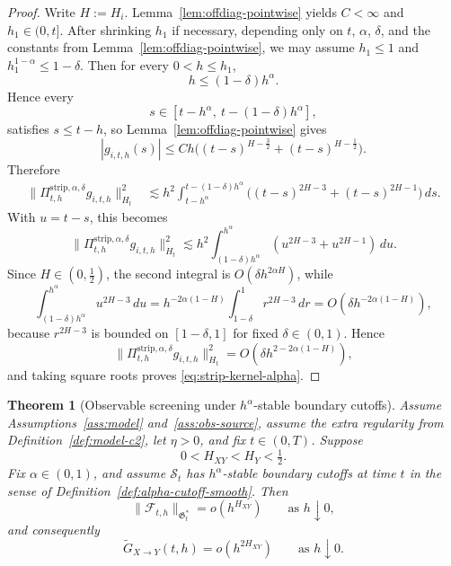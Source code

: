 \documentclass[11pt,a4paper]{amsart}
\theoremstyle{plain}
\newtheorem{theorem}{Theorem}[section]
\theoremstyle{definition}
\theoremstyle{remark}
\begin{document}
\begin{proof}
Write \(H:=H_i\). Lemma~\ref{lem:offdiag-pointwise} yields
\(C<\infty\) and \(h_1\in(0,t]\). After shrinking \(h_1\) if necessary, depending only on
\(t\), \(\alpha\), \(\delta\), and the constants from Lemma~\ref{lem:offdiag-pointwise}, we may
assume \(h_1\le1\) and \(h_1^{1-\alpha}\le1-\delta\). Then for every \(0<h\le h_1\),
\[
h\le (1-\delta)h^\alpha.
\]
Hence every
\[
s\in[t-h^\alpha,\ t-(1-\delta)h^\alpha],
\]
satisfies \(s\le t-h\), so Lemma~\ref{lem:offdiag-pointwise} gives
\[
|g_{i,t,h}(s)|
\le
Ch\bigl((t-s)^{H-\frac32}+(t-s)^{H-\frac12}\bigr).
\]
Therefore
\begin{align*}
\|\Pi_{t,h}^{\mathrm{strip},\alpha,\delta}g_{i,t,h}\|_{H_t}^2
&\lesssim
h^2\int_{t-h^\alpha}^{t-(1-\delta)h^\alpha}
\bigl((t-s)^{2H-3}+(t-s)^{2H-1}\bigr)\,ds.
\end{align*}
With \(u=t-s\), this becomes
\[
\|\Pi_{t,h}^{\mathrm{strip},\alpha,\delta}g_{i,t,h}\|_{H_t}^2
\lesssim
h^2\int_{(1-\delta)h^\alpha}^{h^\alpha}(u^{2H-3}+u^{2H-1})\,du.
\]
Since \(H\in(0,\tfrac12)\), the second integral is \(O(\delta h^{2\alpha H})\), while
\[
\int_{(1-\delta)h^\alpha}^{h^\alpha}u^{2H-3}\,du
=
h^{-2\alpha(1-H)}
\int_{1-\delta}^{1}r^{2H-3}\,dr
=
O\!\left(\delta h^{-2\alpha(1-H)}\right),
\]
because \(r^{2H-3}\) is bounded on \([1-\delta,1]\) for fixed \(\delta\in(0,1)\). Hence
\[
\|\Pi_{t,h}^{\mathrm{strip},\alpha,\delta}g_{i,t,h}\|_{H_t}^2
=
O\!\left(\delta h^{2-2\alpha(1-H)}\right),
\]
and taking square roots proves \eqref{eq:strip-kernel-alpha}.
\end{proof}

\begin{theorem}[Observable screening under \(h^\alpha\)-stable boundary cutoffs]
\label{thm:observable-screening-smooth}
Assume Assumptions~\ref{ass:model} and~\ref{ass:obs-source}, assume the extra regularity from
Definition~\ref{def:model-c2}, let \(\eta>0\), and fix \(t\in(0,T)\). Suppose
\[
0<H_{XY}<H_Y<\tfrac12.
\]
Fix \(\alpha\in(0,1)\), and assume \(\mathcal S_t\) has \(h^\alpha\)-stable boundary
cutoffs at time \(t\) in the sense of Definition~\ref{def:alpha-cutoff-smooth}. Then
\begin{equation}\label{eq:observable-screening-smooth-F}
\|\mathcal F_{t,h}\|_{\mathfrak G_t^*}
=
o(h^{H_{XY}})
\qquad\text{as }h\downarrow0,
\end{equation}
and consequently
\begin{equation}\label{eq:observable-screening-smooth-G}
\widetilde G_{X\to Y}(t,h)
=
o(h^{2H_{XY}})
\qquad\text{as }h\downarrow0.
\end{equation}
\end{theorem}
\end{document}
